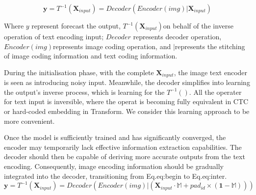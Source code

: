\documentclass[runningheads]{llncs}
\begin{document}
\begin{equation}\label{eq:begin}
    \textbf{y} = \textit{T}^{-1}(\textbf{X}_{input}) = \textit{Decoder}(\textit{Encoder}(img) | \textbf{X}_{input}  )
\end{equation}

Where $y$ represent forecast the output, $\textit {T}^{-1} (\textbf {X}_{input}) $on behalf of the inverse operation of text encoding input; $\textit{Decoder}$ represents decoder operation, $\textit {Encoder}(img)$represents image coding operation, and $|$represents the stitching of image coding information and text coding information.

During the initialisation phase, with the complete $\textbf{X}_{input}$, the image text encoder is seen as introducing noisy input. Meanwhile, the decoder simplifies into learning the output's inverse process, which is learning for the $\textit{T}^{-1}()$. All the operater for text input is inversible, where the operat is becoming fully equivalent in CTC or hard-coded embedding in Transform.	We consider this learning approach to be more convenient.	

Once the model is sufficiently trained and has significantly converged, the encoder may temporarily lack effective information extraction capabilities.	The decoder should then be capable of deriving more accurate outputs from the text encoding.	Consequently, image encoding information should be gradually integrated into the decoder, transitioning from Eq.{eq:begin} to Eq.{eq:inter}.	
\begin{equation}\label{eq:inter}
    \textbf{y} = \textit{T}^{-1}(\textbf{X}_{input}) = \textit{Decoder}(\textit{Encoder}(img) | (\textbf{X}_{input} \cdot \mathbb{M} + pad_{id} \times ( \textbf{1} - \mathbb{M} )) )
\end{equation}
\end{document}
